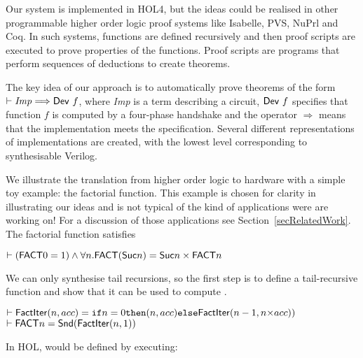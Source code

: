 
Our system is implemented in HOL4, but the ideas could be
realised in other programmable higher order logic proof systems like
Isabelle, PVS, NuPrl and Coq. In such systems, functions are defined
recursively and then proof scripts are executed to prove properties of
the functions.  Proof scripts are programs that perform sequences of
deductions to create theorems.

The key idea of our approach is to automatically prove theorems of the
form $\vdash {\it{Imp}}\Longrightarrow\mathsf{Dev}~f$, where
{\it{Imp}} is a term describing a circuit, $\mathsf{Dev}~f$ specifies
that function $f$ is computed by a four-phase handshake and the
operator $\Longrightarrow$ means that the implementation meets the
specification.  Several different representations of implementations
are created, with the lowest level corresponding to
synthesisable Verilog.

We illustrate the translation from higher order logic to hardware with a
simple toy example: the factorial function. This example is chosen for
clarity in illustrating our ideas and is not typical of the kind of
applications were are working on!  For a discussion of those
applications see Section~\ref{secRelatedWork}.
The factorial function  satisfies

\vspace*{-2mm}

{\baselineskip10pt\begin{alltt}
 \(\vdash (\DEF{FACT} 0 = 1) \wedge {\forall}n. \DEF{FACT}(\DEF{Suc} n) = \DEF{Suc} n \times \DEF{FACT} n\)
\end{alltt}}

\vspace*{-2mm}
We can only synthesise tail recursions, so the first
step is to define a tail-recursive function  and show
that it can be used to compute .

\vspace*{-2mm}

{\baselineskip14pt\begin{alltt}
\( \vdash \DEF{FactIter}(n,acc) = \texttt{if} n=0 \texttt{then} (n,acc) \texttt{else} \DEF{FactIter}(n-1,n{\times}acc)) \)
\( \vdash \DEF{FACT} n = \DEF{Snd}(\DEF{FactIter}(n,1)) \)
\end{alltt}}

\vspace*{-2mm}

\noindent In HOL,  would be defined by executing:


